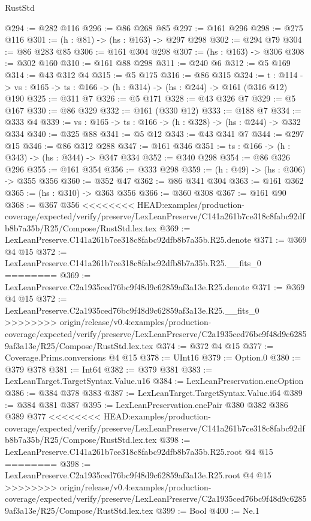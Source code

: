 \begin{lexlean}{RustStd}
\begin{coremodule}
{\begin{coremodule}
@294 := @282 @116
@296 := @86 @268 @85
@297 := @161 @296
@298 := @275 @116
@301 := (h : @81) -> (hs : @163) -> @297 @298
@302 := @294 @79
@304 := @86 @283 @85
@306 := @161 @304 @298
@307 := (hs : @163) -> @306
@308 := @302 @160
@310 := @161 @88 @298
@311 := @240 @6
@312 := @5 @169
@314 := @43 @312 @4
@315 := @5 @175
@316 := @86 @315
@324 := {t : @114} ->
  {vs : @165} -> {ts : @166} -> (h : @314) -> (hs : @244) -> @161 (@316 @12) @190
@325 := @311 @7
@326 := @5 @171
@328 := @43 @326 @7
@329 := @5 @167
@330 := @86 @329
@332 := @161 (@330 @12)
@333 := @188 @7
@334 := @333 @4
@339 := {vs : @165} -> {ts : @166} -> (h : @328) -> (hs : @244) -> @332 @334
@340 := @325 @88
@341 := @5 @12
@343 := @43 @341 @7
@344 := @297 @15
@346 := @86 @312 @288
@347 := @161 @346
@351 := {ts : @166} -> (h : @343) -> (hs : @344) -> @347 @334
@352 := @340 @298
@354 := @86 @326 @296
@355 := @161 @354
@356 := @333 @298
@359 := (h : @49) -> (hs : @306) -> @355 @356
@360 := @352 @47
@362 := @86 @341 @304
@363 := @161 @362
@365 := (hs : @310) -> @363 @356
@366 := @360 @308
@367 := @161 @90
@368 := @367 @356
<<<<<<<< HEAD:examples/production-coverage/expected/verify/preserve/LexLeanPreserve/C141a261b7ce318c8fabc92dfb8b7a35b/R25/Compose/RustStd.lex.tex
@369 := LexLeanPreserve.C141a261b7ce318c8fabc92dfb8b7a35b.R25.denote
@371 := @369 @4 @15
@372 := LexLeanPreserve.C141a261b7ce318c8fabc92dfb8b7a35b.R25.__fits_0
========
@369 := LexLeanPreserve.C2a1935ced76bc9f48d9c62859af3a13e.R25.denote
@371 := @369 @4 @15
@372 := LexLeanPreserve.C2a1935ced76bc9f48d9c62859af3a13e.R25.__fits_0
>>>>>>>> origin/release/v0.4:examples/production-coverage/expected/verify/preserve/LexLeanPreserve/C2a1935ced76bc9f48d9c62859af3a13e/R25/Compose/RustStd.lex.tex
@374 := @372 @4 @15
@377 := Coverage.Prims.conversions @4 @15
@378 := UInt16
@379 := Option.{0}
@380 := @379 @378
@381 := Int64
@382 := @379 @381
@383 := LexLeanTarget.TargetSyntax.Value.u16
@384 := LexLeanPreservation.encOption
@386 := @384 @378 @383
@387 := LexLeanTarget.TargetSyntax.Value.i64
@389 := @384 @381 @387
@395 := LexLeanPreservation.encPair @380 @382 @386 @389 @377
<<<<<<<< HEAD:examples/production-coverage/expected/verify/preserve/LexLeanPreserve/C141a261b7ce318c8fabc92dfb8b7a35b/R25/Compose/RustStd.lex.tex
@398 := LexLeanPreserve.C141a261b7ce318c8fabc92dfb8b7a35b.R25.root @4 @15
========
@398 := LexLeanPreserve.C2a1935ced76bc9f48d9c62859af3a13e.R25.root @4 @15
>>>>>>>> origin/release/v0.4:examples/production-coverage/expected/verify/preserve/LexLeanPreserve/C2a1935ced76bc9f48d9c62859af3a13e/R25/Compose/RustStd.lex.tex
@399 := Bool
@400 := Ne.{1}

\end{coremodule}}
\end{coremodule}
\end{lexlean}
